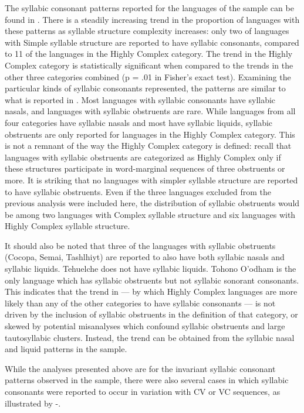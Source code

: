   The syllabic consonant patterns reported for the languages of the sample can be found in . There is a steadily increasing trend in the proportion of languages with these patterns as syllable structure complexity increases: only two of languages with Simple syllable structure are reported to have syllabic consonants, compared to 11 of the languages in the Highly Complex category. The trend in the Highly Complex category is statistically significant when compared to the trends in the other three categories combined (p = .01 in Fisher’s exact test). Examining the particular kinds of syllabic consonants represented, the patterns are similar to what is reported in \citet{Bell1978a}. Most languages with syllabic consonants have syllabic nasals, and languages with syllabic obstruents are rare. While languages from all four categories have syllabic nasals and most have syllabic liquids, syllabic obstruents are only reported for languages in the Highly Complex category. This is not a remnant of the way the Highly Complex category is defined: recall that languages with syllabic obstruents are categorized as Highly Complex only if these structures participate in word-marginal sequences of three obstruents or more. It is striking that no languages with simpler syllable structure are reported to have syllabic obstruents. Even if the three languages excluded from the previous analysis were included here, the distribution of syllabic obstruents would be among two languages with Complex syllable structure and six languages with Highly Complex syllable structure. 

  It should also be noted that three of the languages with syllabic obstruents (Cocopa, Semai, Tashlhiyt) are reported to also have both syllabic nasals and syllabic liquids. Tehuelche does not have syllabic liquids. Tohono O’odham is the only language which has syllabic obstruents but not syllabic sonorant consonants. This indicates that the trend in  — by which Highly Complex languages are more likely than any of the other categories to have syllabic consonants  — is not driven by the inclusion of syllabic obstruents in the definition of that category, or skewed by potential misanalyses which confound syllabic obstruents and large tautosyllabic clusters. Instead, the trend can be obtained from the syllabic nasal and liquid patterns in the sample.

  While the analyses presented above are for the invariant syllabic consonant patterns observed in the sample, there were also several cases in which syllabic consonants were reported to occur in variation with CV or VC sequences, as illustrated by -.

